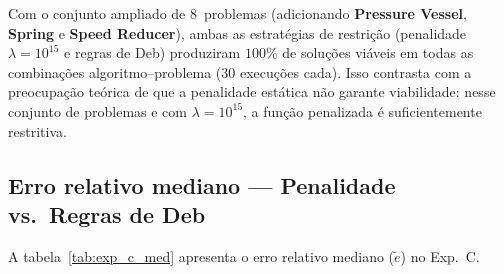 \documentclass[12pt, a4paper]{article}
\begin{document}
Com o conjunto ampliado de 8~problemas (adicionando \textbf{Pressure
Vessel}, \textbf{Spring} e \textbf{Speed Reducer}), ambas as
estratégias de restrição (penalidade $\lambda = 10^{15}$ e regras de
Deb) produziram $100\%$ de soluções viáveis em todas as combinações
algoritmo--problema (30 execuções cada). Isso contrasta com a
preocupação teórica de que a penalidade estática não garante
viabilidade: nesse conjunto de problemas e com $\lambda = 10^{15}$,
a função penalizada é suficientemente restritiva.

\subsection{Erro relativo mediano — Penalidade vs.\ Regras de Deb}

A tabela~\ref{tab:exp_c_med} apresenta o erro relativo mediano
($\tilde{e}$) no Exp.~C.
\end{document}
